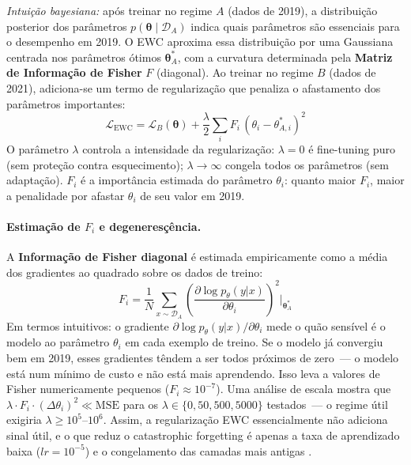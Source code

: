 \documentclass[11pt,a4paper]{article}
\begin{document}
\emph{Intui\c{c}\~ao bayesiana:} ap\'os treinar no regime $A$ (dados de 2019), a distribui\c{c}\~ao posterior dos par\^ametros $p(\boldsymbol\theta\mid\mathcal{D}_A)$ indica quais par\^ametros s\~ao essenciais para o desempenho em 2019. O EWC aproxima essa distribui\c{c}\~ao por uma Gaussiana centrada nos par\^ametros \'otimos $\boldsymbol\theta^*_A$, com a curvatura determinada pela \textbf{Matriz de Informa\c{c}\~ao de Fisher} $F$ (diagonal). Ao treinar no regime $B$ (dados de 2021), adiciona-se um termo de regulariza\c{c}\~ao que penaliza o afastamento dos par\^ametros importantes:
\[
\mathcal{L}_\mathrm{EWC} = \mathcal{L}_B(\boldsymbol\theta) +
\frac{\lambda}{2}\sum_i F_i\,(\theta_i - \theta^*_{A,i})^2
\]
O par\^ametro $\lambda$ controla a intensidade da regulariza\c{c}\~ao: $\lambda = 0$ \'e fine-tuning puro (sem prote\c{c}\~ao contra esquecimento); $\lambda \to \infty$ congela todos os par\^ametros (sem adapta\c{c}\~ao). $F_i$ \'e a import\^ancia estimada do par\^ametro $\theta_i$: quanto maior $F_i$, maior a penalidade por afastar $\theta_i$ de seu valor em 2019.

\paragraph{Estima\c{c}\~ao de $F_i$ e degeneres\c{c}\^encia.}
A \textbf{Informa\c{c}\~ao de Fisher diagonal} \'e estimada empiricamente como a m\'edia dos gradientes ao quadrado sobre os dados de treino:
\[
F_i = \frac{1}{N}\sum_{x\sim\mathcal{D}_A}\left(\frac{\partial \log
p_\theta(y|x)}{\partial \theta_i}\right)^2 \bigg|_{\boldsymbol\theta^*_A}
\]
Em termos intuitivos: o gradiente $\partial \log p_\theta(y|x)/\partial \theta_i$ mede o qu\~ao sens\'ivel \'e o modelo ao par\^ametro $\theta_i$ em cada exemplo de treino. Se o modelo j\'a convergiu bem em 2019, esses gradientes t\^endem a ser todos pr\'oximos de zero~--- o modelo est\'a num m\'inimo de custo e n\~ao est\'a mais aprendendo. Isso leva a valores de Fisher numericamente pequenos ($F_i \approx 10^{-7}$). Uma an\'alise de escala mostra que $\lambda \cdot F_i \cdot (\Delta\theta_i)^2 \ll \text{MSE}$ para os $\lambda \in \{0, 50, 500, 5000\}$ testados~--- o regime \'util exigiria $\lambda \geq 10^{5}\text{--}10^{6}$. Assim, a regulariza\c{c}\~ao EWC essencialmente n\~ao adiciona sinal \'util, e o que reduz o catastrophic forgetting \'e apenas a taxa de aprendizado baixa ($lr = 10^{-5}$) e o congelamento das camadas mais antigas \cite{kirkpatrick2017,lesort2020}.
\end{document}
